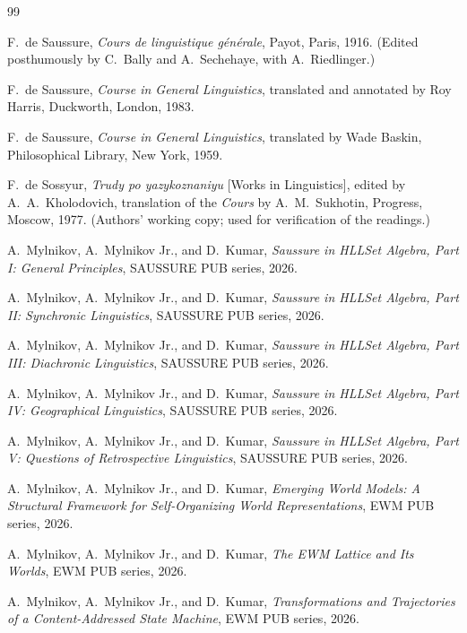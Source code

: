 \documentclass[11pt,a4paper]{article}
\theoremstyle{remark}
\begin{document}
\begin{thebibliography}{99}

 F.~de Saussure,
\textit{Cours de linguistique g\'en\'erale}, Payot, Paris, 1916.
(Edited posthumously by C.~Bally and A.~Sechehaye, with A.~Riedlinger.)

 F.~de Saussure,
\textit{Course in General Linguistics}, translated and annotated by
Roy Harris, Duckworth, London, 1983.

 F.~de Saussure,
\textit{Course in General Linguistics}, translated by Wade Baskin,
Philosophical Library, New York, 1959.

 F.~de Sossyur,
\textit{Trudy po yazykoznaniyu} [Works in Linguistics], edited by
A.~A.~Kholodovich, translation of the \textit{Cours} by A.~M.~Sukhotin,
Progress, Moscow, 1977.
(Authors' working copy; used for verification of the readings.)

 A.~Mylnikov, A.~Mylnikov Jr., and D.~Kumar,
\textit{Saussure in HLLSet Algebra, Part I: General Principles},
SAUSSURE PUB series, 2026.

 A.~Mylnikov, A.~Mylnikov Jr., and D.~Kumar,
\textit{Saussure in HLLSet Algebra, Part II: Synchronic Linguistics},
SAUSSURE PUB series, 2026.

 A.~Mylnikov, A.~Mylnikov Jr., and D.~Kumar,
\textit{Saussure in HLLSet Algebra, Part III: Diachronic Linguistics},
SAUSSURE PUB series, 2026.

 A.~Mylnikov, A.~Mylnikov Jr., and D.~Kumar,
\textit{Saussure in HLLSet Algebra, Part IV: Geographical Linguistics},
SAUSSURE PUB series, 2026.

 A.~Mylnikov, A.~Mylnikov Jr., and D.~Kumar,
\textit{Saussure in HLLSet Algebra, Part V: Questions of Retrospective
Linguistics}, SAUSSURE PUB series, 2026.

 A.~Mylnikov, A.~Mylnikov Jr., and D.~Kumar,
\textit{Emerging World Models: A Structural Framework for Self-Organizing
World Representations}, EWM PUB series, 2026.

 A.~Mylnikov, A.~Mylnikov Jr., and D.~Kumar,
\textit{The EWM Lattice and Its Worlds}, EWM PUB series, 2026.

 A.~Mylnikov, A.~Mylnikov Jr., and D.~Kumar,
\textit{Transformations and Trajectories of a Content-Addressed State
Machine}, EWM PUB series, 2026.


\end{thebibliography}
\end{document}
